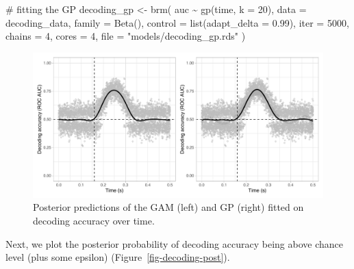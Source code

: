 \documentclass[
  doc,
  floatsintext,
  longtable,
  a4paper,
  nolmodern,
  notxfonts,
  notimes,
  colorlinks=true,linkcolor=blue,citecolor=blue,urlcolor=blue]{apa7}
\newenvironment{Shaded}{\begin{snugshade}}{\end{snugshade}}
\newcommand{\AttributeTok}[1]{\textcolor[rgb]{0.40,0.45,0.13}{#1}}
\newcommand{\CommentTok}[1]{\textcolor[rgb]{0.37,0.37,0.37}{#1}}
\newcommand{\DecValTok}[1]{\textcolor[rgb]{0.68,0.00,0.00}{#1}}
\newcommand{\FloatTok}[1]{\textcolor[rgb]{0.68,0.00,0.00}{#1}}
\newcommand{\FunctionTok}[1]{\textcolor[rgb]{0.28,0.35,0.67}{#1}}
\newcommand{\NormalTok}[1]{\textcolor[rgb]{0.00,0.23,0.31}{#1}}
\newcommand{\OtherTok}[1]{\textcolor[rgb]{0.00,0.23,0.31}{#1}}
\newcommand{\SpecialCharTok}[1]{\textcolor[rgb]{0.37,0.37,0.37}{#1}}
\newcommand{\StringTok}[1]{\textcolor[rgb]{0.13,0.47,0.30}{#1}}
\begin{document}
\begin{Shaded}
\begin{Highlighting}[]
\CommentTok{\# fitting the GP}
\NormalTok{decoding\_gp }\OtherTok{\textless{}{-}} \FunctionTok{brm}\NormalTok{(}
\NormalTok{    auc }\SpecialCharTok{\textasciitilde{}} \FunctionTok{gp}\NormalTok{(time, }\AttributeTok{k =} \DecValTok{20}\NormalTok{),}
    \AttributeTok{data =}\NormalTok{ decoding\_data,}
    \AttributeTok{family =} \FunctionTok{Beta}\NormalTok{(),}
    \AttributeTok{control =} \FunctionTok{list}\NormalTok{(}\AttributeTok{adapt\_delta =} \FloatTok{0.99}\NormalTok{),}
    \AttributeTok{iter =} \DecValTok{5000}\NormalTok{,}
    \AttributeTok{chains =} \DecValTok{4}\NormalTok{,}
    \AttributeTok{cores =} \DecValTok{4}\NormalTok{,}
    \AttributeTok{file =} \StringTok{"models/decoding\_gp.rds"}
\NormalTok{    )}
\end{Highlighting}
\end{Shaded}

\begin{figure}[H]

\caption{Posterior predictions of the GAM (left) and GP (right) fitted
on decoding accuracy over time.}

{\centering \includegraphics[width=1\textwidth,height=\textheight]{brms_meeg_files/figure-pdf/decoding-preds-1.pdf}

}

\end{figure}%

Next, we plot the posterior probability of decoding accuracy being above
chance level (plus some epsilon) (Figure~\ref{fig-decoding-post}).
\end{document}
